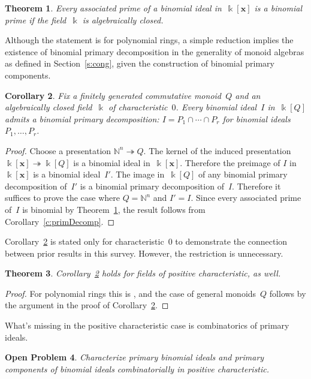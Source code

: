 \documentclass[12pt]{amsart}
\numberwithin{equation}{section}
\newtheorem{thm}{Theorem}[section]
\newtheorem{cor}[thm]{Corollary}
\newtheorem{prob}[thm]{Open Problem}
\theoremstyle{definition}
\begin{document}
\begin{thm}\label{t:es}
Every associated prime of a binomial ideal in~${\Bbbk}[{\mathbf{x}}]$ is a binomial
prime if the field\/~${\Bbbk}$ is algebraically closed.
\end{thm}

Although the statement is for polynomial rings, a simple reduction
implies the existence of binomial primary decomposition in the
generality of monoid algebras as defined in Section~\ref{s:cong},
given the construction of binomial primary components.

\begin{cor}\label{c:char0}
Fix a finitely generated commutative monoid~$Q$ and an algebraically
closed field\/~${\Bbbk}$ of characteristic~$0$.  Every binomial ideal~$I$
in~${\Bbbk}[Q]$ admits a binomial primary decomposition: $I = P_1 \cap
\cdots \cap P_r$ for binomial ideals $P_1,\ldots,P_r$.
\end{cor}
\begin{proof}
Choose a presentation ${\mathbb{N}}^n {\twoheadrightarrow} Q$.  The kernel of the induced
presentation ${\Bbbk}[{\mathbf{x}}] {\twoheadrightarrow} {\Bbbk}[Q]$ is a binomial ideal
in~${\Bbbk}[{\mathbf{x}}]$.  Therefore the preimage of $I$ in~${\Bbbk}[{\mathbf{x}}]$ is a
binomial ideal~$I'$.  The image in~${\Bbbk}[Q]$ of any binomial primary
decomposition of~$I'$ is a binomial primary decomposition of~$I$.
Therefore it suffices to prove the case where $Q = {\mathbb{N}}^n$ and $I' =
I$.  Since every associated prime of~$I$ is binomial by
Theorem~\ref{t:es}, the result follows from
Corollary~\ref{c:primDecomp}.
\end{proof}

Corollary~\ref{c:char0} is stated only for characteristic~$0$ to
demonstrate the connection between prior results in this survey.
However, the restriction is unnecessary.

\begin{thm}\label{t:allChar}
Corollary~\ref{c:char0} holds for fields of positive characteristic,
as well.
\end{thm}
\begin{proof}
For polynomial rings this is \cite[Theorem~7.1]{binomialIdeals}, and
the case of general monoids~$Q$ follows by the argument in the proof
of Corollary~\ref{c:char0}.
\end{proof}

What's missing in the positive characteristic case is combinatorics of
primary ideals.

\begin{prob}
Characterize primary binomial ideals and primary components of
binomial ideals combinatorially in positive characteristic.
\end{prob}
\end{document}
